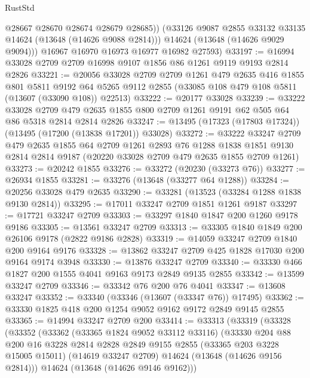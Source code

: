 \begin{lexlean}{RustStd}
\begin{coremodule}
            @28667
            @28670
            @28674
            @28679
            @28685))
        (@33126 @9087 @2855 @33132 @33135 @14624 (@13648 (@14626 @9088 @2814)))
        @14624
        (@13648 (@14626 @9029 @9094)))
      @16967
      @16970
      @16973
      @16977
      @16982
      @27593)
@33197 := @16994 @33028 @2709 @2709 @16998 @9107 @1856 @86 @1261 @9119 @9193 @2814 @2826
@33221 := @20056
    @33028
    @2709
    @2709
    @1261
    @479
    @2635
    @416
    @1855
    @801
    @5811
    @9192
    @64
    @5265
    @9112
    @2855
    (@33085 @108 @479 @108 @5811 (@13607 (@33090 @108)) @22513)
@33222 := @20177 @33028
@33239 := @33222
    @33028
    @2709
    @479
    @2635
    @1855
    @800
    @2709
    @1261
    @9191
    @62
    @505
    @64
    @86
    @5318
    @2814
    @2814
    @2826
@33247 := @13495 (@17323 (@17803 @17324)) (@13495 (@17200 (@13838 @17201)) @33028)
@33272 := @33222
    @33247
    @2709
    @479
    @2635
    @1855
    @64
    @2709
    @1261
    @2893
    @76
    @1288
    @1838
    @1851
    @9130
    @2814
    @2814
    @9187
    (@20220 @33028 @2709 @479 @2635 @1855 @2709 @1261)
@33273 := @20242 @1855
@33276 := @33272 (@20230 (@33273 @76))
@33277 := @26934 @1855
@33281 := @33276 (@13648 (@33277 @64 @1288))
@33284 := @20256 @33028 @479 @2635
@33290 := @33281 (@13523 (@33284 @1288 @1838 @9130 @2814))
@33295 := @17011 @33247 @2709 @1851 @1261 @9187
@33297 := @17721 @33247 @2709
@33303 := @33297 @1840 @1847 @200 @1260 @9178 @9186
@33305 := @13561 @33247 @2709
@33313 := @33305 @1840 @1849 @200 @26106 @9178 (@2822 @9186 @2828)
@33319 := @14059 @33247 @2709 @1840 @200 @9164 @9176
@33328 := @13862 @33247 @2709 @425 @1828 @17030 @200 @9164 @9174 @3948
@33330 := @13876 @33247 @2709
@33340 := @33330 @466 @1827 @200 @1555 @4041 @9163 @9173 @2849 @9135 @2855
@33342 := @13599 @33247 @2709
@33346 := @33342 @76 @200 @76 @4041
@33347 := @13608 @33247
@33352 := @33340 (@33346 (@13607 (@33347 @76)) @17495)
@33362 := @33330 @1825 @418 @200 @1254 @9052 @9162 @9172 @2849 @9145 @2855
@33365 := @14994 @33247 @2709 @200
@33414 := @33313
    (@33319
      (@33328
        (@33352
          (@33362
            (@33365 @1824 @9052 @33112 @33116)
            (@33330
              @204
              @88
              @200
              @16
              @3228
              @2814
              @2828
              @2849
              @9155
              @2855
              (@33365 @203 @3228 @15005 @15011)
              (@14619 @33247 @2709)
              @14624
              (@13648 (@14626 @9156 @2814)))
            @14624
            (@13648 (@14626 @9146 @9162)))

\end{coremodule}
\end{lexlean}
